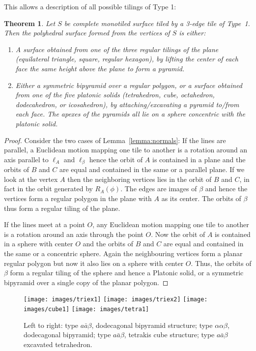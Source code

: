 \documentclass[11pt]{amsart}
\newtheorem{theorem}{Theorem}
\theoremstyle{remark}
\newcounter{case}
\begin{document}
This allows a description of all possible tilings of Type 1:
\begin{theorem}  \label{thm:type1}
  Let $S$ be complete monotiled surface tiled by a 3-edge tile of
  Type~1. Then the polyhedral surface formed from the vertices of $S$ is either:
  \begin{enumerate}
    \item A surface obtained from one of the three regular tilings of the plane (equilateral triangle, square,  regular hexagon),
    by lifting the center of each face the same height above the plane to form a pyramid.
  \item Either a symmetric bipyramid over a regular polygon, or a surface obtained from one of the five platonic solids (tetrahedron, cube,
    octahedron, dodecahedron, or icosahedron),  by attaching/excavating a pyramid to/from each face. The 
    apexes of the pyramids all lie on a sphere concentric with the platonic solid.
  \end{enumerate}
\end{theorem}
\begin{proof} 
 Consider the two cases of Lemma~\ref{lemma:normals}:
  If the lines are parallel, a Euclidean motion mapping one tile to another
  is a rotation around an axis parallel to $\ell_A$ and $\ell_{\beta}$
  hence the orbit of $A$ is contained in a plane and the orbits of $B$
  and $C$ are equal and contained in the same or a parallel plane. If
  we look at the vertex $A$ then the neighboring vertices lies in the
  orbit of $B$ and $C$, in fact in the orbit generated by
  $R_{A}(\phi)$. The edges are images of $\beta$ and hence the vertices
  form a regular polygon in the plane with $A$ as its center. 
  The orbits of $\beta$ thus form a regular tiling of the plane.
  
  If the lines meet at a point $O$, any Euclidean motion mapping one tile to another is
  a rotation around an axis through the point $O$. Now the orbit of
  $A$ is contained in a sphere with center $O$ and the orbits of $B$
  and $C$ are equal and contained in the same or a concentric
  sphere. Again the neighbouring vertices form a planar regular
  polygon but now it also lies on a sphere with center $O$.  Thus,
the orbits of $\beta$ form a regular tiling of the sphere and hence a Platonic solid, or a symmetric bipyramid 
over a single copy of the planar polygon.
\end{proof}
\begin{figure}[h!tbp]
	\begin{center}
		\texttt{[image: images/triex1]} \quad \quad
		\texttt{[image: images/triex2]} \quad \quad
		\texttt{[image: images/cube1]} \quad \quad
		\texttt{[image: images/tetra1]}
		\end{center}
	\caption{Left to right: type $a \bar a \beta$, dodecagonal bipyramid structure;
	  type $\alpha \alpha \beta$, dodecagonal bipyramid;
	   type $a \bar a \beta$, tetrakis cube structure;
	   type $a \bar a \beta$ excavated tetrahedron.}
	\label{fig:threeedge}
\end{figure}
\end{document}
